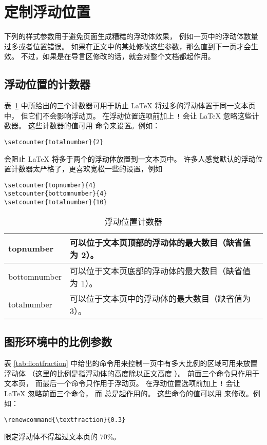 \section{定制浮动位置}\label{sec:typerule}

下列的样式参数用于避免页面生成糟糕的浮动体效果，
例如一页中的浮动体数量过多或者位置错误。
如果在正文中的某处修改这些参数，那么直到下一页才会生效。
不过，如果是在导言区修改的话，就会对整个文档都起作用。

\subsection{浮动位置的计数器}

表~\ref{tab:floatcounter} 中所给出的三个计数器可用于防止 \LaTeX{} 将过多的浮动体置于同一文本页中，
但它们不会影响浮动页。
在浮动位置选项前加上 \texttt{!} 会让 \LaTeX{} 忽略这些计数器。
这些计数器的值可用  命令来设置。例如：
\begin{lstlisting}
\setcounter{totalnumber}{2}
\end{lstlisting}
会阻止 \LaTeX{} 将多于两个的浮动体放置到一文本页中。
许多人感觉默认的浮动位置计数器太严格了，更喜欢宽松一些的设置，例如
\begin{lstlisting}
\setcounter{topnumber}{4}
\setcounter{bottomnumber}{4}
\setcounter{totalnumber}{10}
\end{lstlisting}

\begin{table}[htp]
	\centering\kaishu
	\caption{浮动位置计数器}\label{tab:floatcounter}
	\begin{tabular}{>{\ttfamily}l p{} }
		\toprule
		topnumber & 可以位于文本页顶部的浮动体的最大数目（缺省值为 2）。\\
		\hline
		bottomnumber & 可以位于文本页底部的浮动体的最大数目（缺省值为 1）。\\
		\hline
		totalnumber & 可以位于文本页中的浮动体的最大数目（缺省值为 3）。 \\
		\bottomrule
	\end{tabular}
\end{table}

\subsection{图形环境中的比例参数}\label{ssec:figpara}

表 \ref{tab:floatfraction} 中给出的命令用来控制一页中有多大比例的区域可用来放置浮动体
（这里的比例是指浮动体的高度除以正文高度 ）。
前面三个命令只作用于文本页，
而最后一个命令只作用于浮动页。
在浮动位置选项前加上 \texttt{!} 会让 \LaTeX{} 忽略前面三个命令，
而  总是起作用的。
这些命令的值可以用  来修改。例如：
\begin{lstlisting}
\renewcommand{\textfraction}{0.3}
\end{lstlisting}
限定浮动体不得超过文本页的 $70\percent$。

